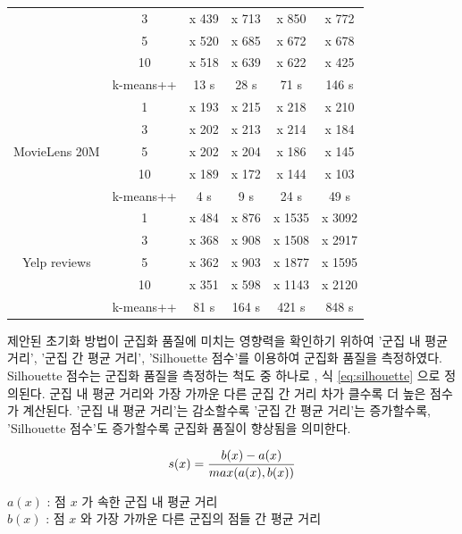 \documentclass[oneside, ko,phd]{snuthesis_utf8_kor}
\begin{document}
\begin{table}[H]
\begin{tabular}{|c|c|c|c|c|c|}
 & 3 & x 439 & x 713 & x 850 & x 772 \\ \cline{2-6} 
 & 5 & x 520 & x 685 & x 672 & x 678 \\ \cline{2-6} 
 & 10 & x 518 & x 639 & x 622 & x 425 \\ \cline{2-6} 
 & k-means++ & 13 s & 28 s & 71 s & 146 s \\ \hline
\multirow{5}{*}{MovieLens 20M} & 1 & x 193 & x 215 & x 218 & x 210 \\ \cline{2-6} 
 & 3 & x 202 & x 213 & x 214 & x 184 \\ \cline{2-6} 
 & 5 & x 202 & x 204 & x 186 & x 145 \\ \cline{2-6} 
 & 10 & x 189 & x 172 & x 144 & x 103 \\ \cline{2-6} 
 & k-means++ & 4 s & 9 s & 24 s & 49 s \\ \hline
\multirow{5}{*}{Yelp reviews} & 1 & x 484 & x 876 & x 1535 & x 3092 \\ \cline{2-6} 
 & 3 & x 368 & x 908 & x 1508 & x 2917 \\ \cline{2-6} 
 & 5 & x 362 & x 903 & x 1877 & x 1595 \\ \cline{2-6} 
 & 10 & x 351 & x 598 & x 1143 & x 2120 \\ \cline{2-6} 
 & k-means++ & 81 s & 164 s & 421 s & 848 s \\ \hline
\end{tabular}
\end{table}

제안된 초기화 방법이 군집화 품질에 미치는 영향력을 확인하기 위하여 '군집 내 평균 거리', '군집 간 평균 거리', 'Silhouette 점수'를 이용하여 군집화 품질을 측정하였다.
Silhouette 점수는 군집화 품질을 측정하는 척도 중 하나로 \cite{rousseeuw1987silhouettes, lewis2012human}, 식 \ref{eq:silhouette} 으로 정의된다.
군집 내 평균 거리와 가장 가까운 다른 군집 간 거리 차가 클수록 더 높은 점수가 계산된다.
'군집 내 평균 거리'는 감소할수록 '군집 간 평균 거리'는 증가할수록, 'Silhouette 점수'도 증가할수록 군집화 품질이 향상됨을 의미한다.

\begin{equation}
\label{eq:silhouette}
\centering
s(x) = \frac{b(x) - a(x)}{max(a(x), b(x))}
\end{equation}

\begin{flushleft}
$a(x)$ : 점 $x$ 가 속한 군집 내 평균 거리 \\
$b(x)$ : 점 $x$ 와 가장 가까운 다른 군집의 점들 간 평균 거리 \\
\end{flushleft}
\end{document}
